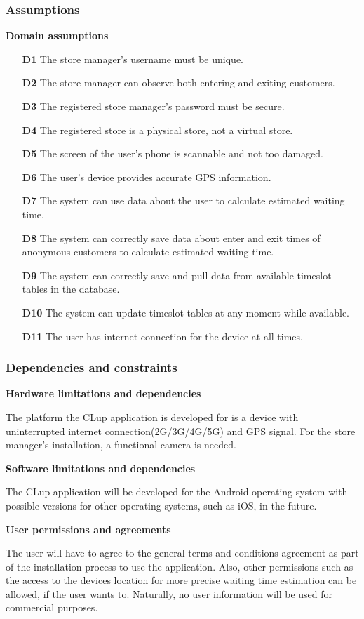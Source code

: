 \subsubsection{Assumptions}
\textbf{Domain assumptions}

\begin{itemize}
	\item[\textbf{D1}]The store manager's username must be unique. 
	\item[\textbf{D2}]The store manager can observe both entering and exiting customers.
	\item[\textbf{D3}]The registered store manager's password must be secure.
	\item[\textbf{D4}]The registered store is a physical store, not a virtual store.
	\item[\textbf{D5}]The screen of the user's phone is scannable and not too damaged.
	\item[\textbf{D6}]The user's device provides accurate GPS information. 
	\item[\textbf{D7}]The system can use data about the user to calculate estimated waiting time.
	\item[\textbf{D8}]The system can correctly save data about enter and exit times of anonymous customers to calculate estimated waiting time. 
	\item[\textbf{D9}]The system can correctly save and pull data from available timeslot tables in the database.
	\item[\textbf{D10}]The system can update timeslot tables at any moment while available. 
	\item[\textbf{D11}]The user has internet connection for the device at all times.
\end{itemize}

\subsubsection{Dependencies and constraints}
\hspace{\parindent}\textbf{Hardware limitations and dependencies}

\hspace{\parindent}The platform the CLup application is developed for is a device with uninterrupted internet connection(2G/3G/4G/5G) and GPS signal. For the store manager's installation, a functional camera is needed. \break

\textbf{Software limitations and dependencies}

\hspace{\parindent}The CLup application will be developed for the Android operating system with possible versions for other operating systems, such as iOS, in the future. \break

\textbf{User permissions and agreements}

\hspace{\parindent}The user will have to agree to the general terms and conditions agreement as part of the installation process to use the application. Also, other permissions such as the access to the devices location for more precise waiting time estimation can be allowed, if the user wants to. Naturally, no user information will be used for commercial purposes. 


